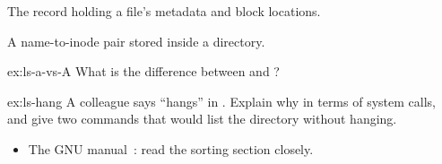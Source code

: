 \chaptervocab
\begin{vocablist}
  \item[Inode] The record holding a file's metadata and block locations.
  \item[Directory entry] A name-to-inode pair stored inside a directory.
\end{vocablist}

\chapterexercises
\begin{exercise}[1]{ex:ls-a-vs-A}
What is the difference between  and ?
\end{exercise}
\begin{exercise}[3]{ex:ls-hang}
A colleague says  ``hangs'' in . Explain why in terms of system calls, and give two commands that would list the directory without hanging.
\end{exercise}

\furtherreading
\begin{itemize}
  \item The GNU  manual~\cite{gnu-ls}: read the sorting section closely.
\end{itemize}
